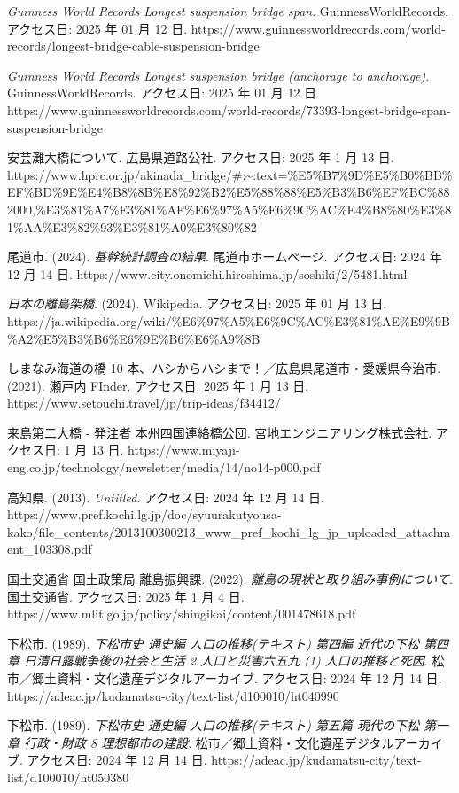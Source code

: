 \emph{Guinness World Records Longest suspension bridge span}.
GuinnessWorldRecords. アクセス日: 2025 年 01 月 12 日.
https://www.guinnessworldrecords.com/world-records/longest-bridge-cable-suspension-bridge

\emph{Guinness World Records Longest suspension bridge (anchorage to
anchorage)}. GuinnessWorldRecords. アクセス日: 2025 年 01 月 12 日.
https://www.guinnessworldrecords.com/world-records/73393-longest-bridge-span-suspension-bridge

安芸灘大橋について. 広島県道路公社. アクセス日: 2025 年 1 月 13 日.
https://www.hprc.or.jp/akinada\_bridge/\#:\textasciitilde:text=\%E5\%B7\%9D\%E5\%B0\%BB\%EF\%BD\%9E\%E4\%B8\%8B\%E8\%92\%B2\%E5\%88\%88\%E5\%B3\%B6\%EF\%BC\%882000,\%E3\%81\%A7\%E3\%81\%AF\%E6\%97\%A5\%E6\%9C\%AC\%E4\%B8\%80\%E3\%81\%AA\%E3\%82\%93\%E3\%81\%A0\%E3\%80\%82

尾道市. (2024). \emph{基幹統計調査の結果}. 尾道市ホームページ.
アクセス日: 2024 年 12 月 14 日.
https://www.city.onomichi.hiroshima.jp/soshiki/2/5481.html

\emph{日本の離島架橋}. (2024). Wikipedia. アクセス日: 2025 年 01 月 13
日.
https://ja.wikipedia.org/wiki/\%E6\%97\%A5\%E6\%9C\%AC\%E3\%81\%AE\%E9\%9B\%A2\%E5\%B3\%B6\%E6\%9E\%B6\%E6\%A9\%8B

しまなみ海道の橋 10 本、ハシからハシまで！／広島県尾道市・愛媛県今治市.
(2021). 瀬戸内 FInder. アクセス日: 2025 年 1 月 13 日.
https://www.setouchi.travel/jp/trip-ideas/f34412/

来島第二大橋 - 発注者 本州四国連絡橋公団. 宮地エンジニアリング株式会社.
アクセス日: 1 月 13 日.
https://www.miyaji-eng.co.jp/technology/newsletter/media/14/no14-p000.pdf

高知県. (2013). \emph{Untitled}. アクセス日: 2024 年 12 月 14 日.
https://www.pref.kochi.lg.jp/doc/syuurakutyousa-kako/file\_contents/2013100300213\_www\_pref\_kochi\_lg\_jp\_uploaded\_attachment\_103308.pdf

国土交通省 国土政策局 離島振興課. (2022).
\emph{離島の現状と取り組み事例について}. 国土交通省. アクセス日: 2025 年
1 月 4 日. https://www.mlit.go.jp/policy/shingikai/content/001478618.pdf

下松市. (1989). \emph{下松市史 通史編 人口の推移(テキスト) 第四編
近代の下松 第四章 日清日露戦争後の社会と生活 2 人口と災害六五九 (1)
人口の推移と死因}. 松市／郷土資料・文化遺産デジタルアーカイブ.
アクセス日: 2024 年 12 月 14 日.
https://adeac.jp/kudamatsu-city/text-list/d100010/ht040990

下松市. (1989). \emph{下松市史 通史編 人口の推移(テキスト) 第五篇
現代の下松 第一章 行政・財政 8 理想都市の建設}.
松市／郷土資料・文化遺産デジタルアーカイブ. アクセス日: 2024 年 12 月 14
日. https://adeac.jp/kudamatsu-city/text-list/d100010/ht050380


